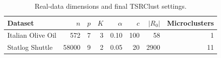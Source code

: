 \begin{table}[!htbp]
\caption{Real-data dimensions and final TSRClust settings.}
\label{tab:realdata-settings}
\centering
\scriptsize
\setlength{\tabcolsep}{2pt}
\begin{tabular}{lrrrrrrr}
\hline
Dataset & $n$ & $p$ & $K$ & $\alpha$ & $c$ & $|R_0|$ & Microclusters \\
\hline
Italian Olive Oil &   572 & 7 & 3 & 0.10 & 100 &   58 &  1 \\
Statlog Shuttle & 58000 & 9 & 2 & 0.05 &  20 & 2900 & 11 \\
\hline
\end{tabular}
\end{table}
